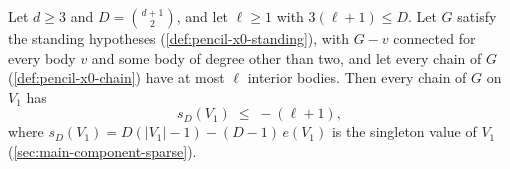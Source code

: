 \begin{lemma}
  \label{lem:pencil-d-chain-count}
  \leanok
  Let $d \ge 3$ and $D = \binom{d+1}{2}$, and let $\ell \ge 1$ with
  $3(\ell + 1) \le D$. Let $G$ satisfy the standing hypotheses
  (\cref{def:pencil-x0-standing}), with $G - v$ connected for every body
  $v$ and some body of degree other than two, and let every chain of $G$
  (\cref{def:pencil-x0-chain}) have at most $\ell$ interior bodies. Then
  every chain of $G$ on $V_1$ has
  \[
    s_D(V_1) \;\le\; -(\ell + 1),
  \]
  where $s_D(V_1) = D(|V_1| - 1) - (D - 1)\,e(V_1)$ is the singleton
  value of $V_1$ (\cref{sec:main-component-sparse}).
\end{lemma}
